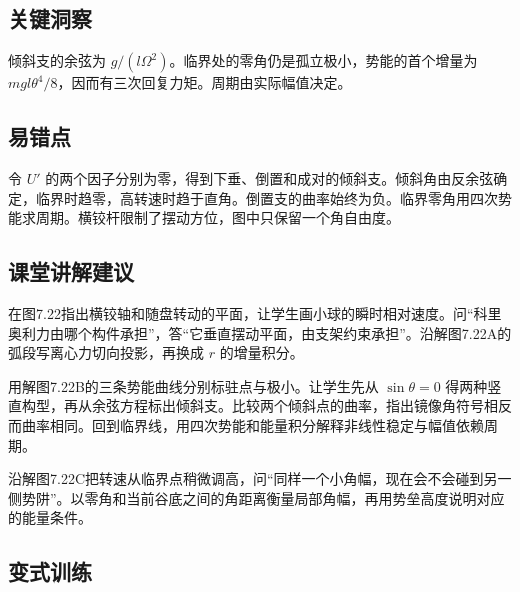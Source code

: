\documentclass[UTF8,fontset=fandol,a4paper,11pt]{ctexart}
\begin{document}


\subsection*{关键洞察}

倾斜支的余弦为 $g/(l\Omega^2)$。临界处的零角仍是孤立极小，势能的首个增量为 $mgl\theta^4/8$，因而有三次回复力矩。周期由实际幅值决定。




\subsection*{易错点}

令 $U'$ 的两个因子分别为零，得到下垂、倒置和成对的倾斜支。倾斜角由反余弦确定，临界时趋零，高转速时趋于直角。倒置支的曲率始终为负。临界零角用四次势能求周期。横铰杆限制了摆动方位，图中只保留一个角自由度。




\subsection*{课堂讲解建议}

在图7.22指出横铰轴和随盘转动的平面，让学生画小球的瞬时相对速度。问“科里奥利力由哪个构件承担”，答“它垂直摆动平面，由支架约束承担”。沿解图7.22A的弧段写离心力切向投影，再换成 $r$ 的增量积分。

用解图7.22B的三条势能曲线分别标驻点与极小。让学生先从 $\sin\theta=0$ 得两种竖直构型，再从余弦方程标出倾斜支。比较两个倾斜点的曲率，指出镜像角符号相反而曲率相同。回到临界线，用四次势能和能量积分解释非线性稳定与幅值依赖周期。

沿解图7.22C把转速从临界点稍微调高，问“同样一个小角幅，现在会不会碰到另一侧势阱”。以零角和当前谷底之间的角距离衡量局部角幅，再用势垒高度说明对应的能量条件。




\subsection*{变式训练}
\end{document}
